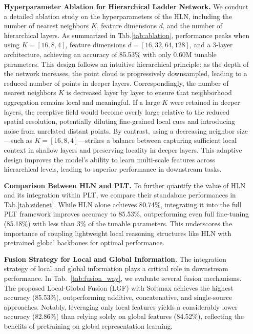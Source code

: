 \textbf{Hyperparameter Ablation for Hierarchical Ladder Network.} We conduct a detailed ablation study on the hyperparameters of the HLN, including the number of nearest neighbors $K$, feature dimensions $d$, and the number of hierarchical layers. As summarized in Tab.\ref{tab:ablation}, performance peaks when using $K=[16,8,4]$, feature dimensions $d=[16,32,64,128]$, and a 3-layer architecture, achieving an accuracy of 85.53\% with only 0.60M tunable parameters. This design follows an intuitive hierarchical principle: as the depth of the network increases, the point cloud is progressively downsampled, leading to a reduced number of points in deeper layers. Correspondingly, the number of nearest neighbors $K$ is decreased layer by layer to ensure that neighborhood aggregation remains local and meaningful. If a large $K$ were retained in deeper layers, the receptive field would become overly large relative to the reduced spatial resolution, potentially diluting fine-grained local cues and introducing noise from unrelated distant points. By contrast, using a decreasing neighbor size—such as $K=[16,8,4]$—strikes a balance between capturing sufficient local context in shallow layers and preserving locality in deeper layers. This adaptive design improves the model’s ability to learn multi-scale features across hierarchical levels, leading to superior performance in downstream tasks.

\textbf{Comparison Between HLN and PLT.} To further quantify the value of HLN and its integration within PLT, we compare their standalone performances in Tab.\ref{tab:sidenet}. While HLN alone achieves 80.74\%, integrating it into the full PLT framework improves accuracy to 85.53\%, outperforming even full fine-tuning (85.18\%) with less than 3\% of the tunable parameters. This underscores the importance of coupling lightweight local reasoning structures like HLN with pretrained global backbones for optimal performance.

\textbf{Fusion Strategy for Local and Global Information.} The integration strategy of local and global information plays a critical role in downstream performance. In Tab.~\ref{tab:fusion_way}, we evaluate several fusion mechanisms. The proposed Local-Global Fusion (LGF) with Softmax achieves the highest accuracy (85.53\%), outperforming additive, concatenative, and single-source approaches. Notably, leveraging only local features yields a considerably lower accuracy (82.86\%) than relying solely on global features (84.52\%), reflecting the benefits of pretraining on global representation learning.

